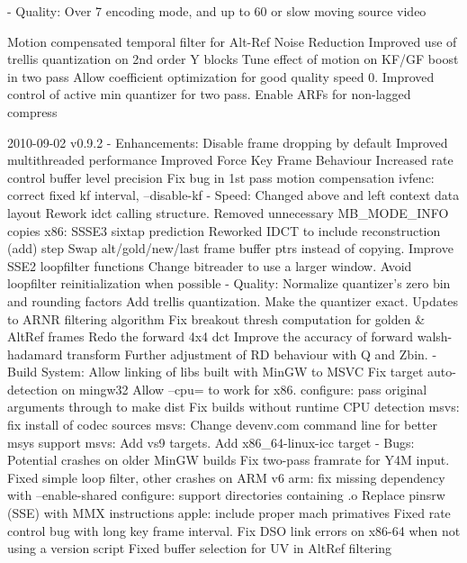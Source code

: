 \begin{DoxyVerbInclude}
  - Quality:
      Over 7%
      encoding mode, and up to 60%
      or slow moving source video

        Motion compensated temporal filter for Alt-Ref Noise Reduction
        Improved use of trellis quantization on 2nd order Y blocks
        Tune effect of motion on KF/GF boost in two pass
        Allow coefficient optimization for good quality speed 0.
        Improved control of active min quantizer for two pass.
        Enable ARFs for non-lagged compress

2010-09-02 v0.9.2
  - Enhancements:
      Disable frame dropping by default
      Improved multithreaded performance
      Improved Force Key Frame Behaviour
      Increased rate control buffer level precision
      Fix bug in 1st pass motion compensation
      ivfenc: correct fixed kf interval, --disable-kf
  - Speed:
      Changed above and left context data layout
      Rework idct calling structure.
      Removed unnecessary MB_MODE_INFO copies
      x86: SSSE3 sixtap prediction
      Reworked IDCT to include reconstruction (add) step
      Swap alt/gold/new/last frame buffer ptrs instead of copying.
      Improve SSE2 loopfilter functions
      Change bitreader to use a larger window.
      Avoid loopfilter reinitialization when possible
  - Quality:
      Normalize quantizer's zero bin and rounding factors
      Add trellis quantization.
      Make the quantizer exact.
      Updates to ARNR filtering algorithm
      Fix breakout thresh computation for golden & AltRef frames
      Redo the forward 4x4 dct
      Improve the accuracy of forward walsh-hadamard transform
      Further adjustment of RD behaviour with Q and Zbin.
  - Build System:
      Allow linking of libs built with MinGW to MSVC
      Fix target auto-detection on mingw32
      Allow --cpu= to work for x86.
      configure: pass original arguments through to make dist
      Fix builds without runtime CPU detection
      msvs: fix install of codec sources
      msvs: Change devenv.com command line for better msys support
      msvs: Add vs9 targets.
      Add x86_64-linux-icc target
  - Bugs:
      Potential crashes on older MinGW builds
      Fix two-pass framrate for Y4M input.
      Fixed simple loop filter, other crashes on ARM v6
      arm: fix missing dependency with --enable-shared
      configure: support directories containing .o
      Replace pinsrw (SSE) with MMX instructions
      apple: include proper mach primatives
      Fixed rate control bug with long key frame interval.
      Fix DSO link errors on x86-64 when not using a version script
      Fixed buffer selection for UV in AltRef filtering



\end{DoxyVerbInclude}
